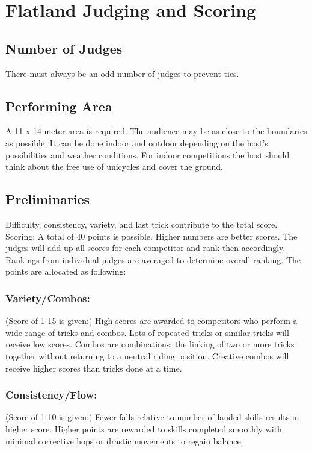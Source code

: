 \section{Flatland Judging and Scoring \label{sec:flat-street_flatland-judging-scoring}}

\subsection{Number of Judges}
There must always be an odd number of judges to prevent ties. 

\subsection{Performing Area}
A 11 x 14 meter area is required.
The audience may be as close to the boundaries as possible.
It can be done indoor and outdoor depending on the host's possibilities and weather conditions.
For indoor competitions the host should think about the free use of unicycles and cover the ground.

\subsection{Preliminaries}
Difficulty, consistency, variety, and last trick contribute to the total score.
Scoring: A total of 40 points is possible.
Higher numbers are better scores.
The judges will add up all scores for each competitor and rank then accordingly.
Rankings from individual judges are averaged to determine overall ranking.
The points are allocated as following: 

\subsubsection{Variety/Combos:}
(Score of 1-15 is given:)
High scores are awarded to competitors who perform a wide range of tricks and combos.
Lots of repeated tricks or similar tricks will receive low scores.
Combos are combinations; the linking of two or more tricks together without returning to a neutral riding position.
Creative combos will receive higher scores than tricks done at a time.

\subsubsection{Consistency/Flow:}
(Score of 1-10 is given:)
Fewer falls relative to number of landed skills results in higher score.
Higher points are rewarded to skills completed smoothly with minimal corrective hops or drastic movements to regain balance.

